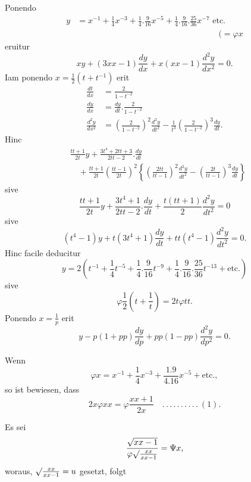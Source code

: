 \begingroup
\setlength{\headheight}{25pt}
\NoSourceHead
{}
\par\indent Ponendo
\[\begin{aligned}
y&=x^{-1}+\frac14x^{-3}+\frac14.\frac9{16}x^{-5}+\frac14.\frac9{16}.\frac{25}{36}x^{-7}\text{ etc.}\\
&\hspace{17em}(=\varphi x
\end{aligned}\]
\noindent eruitur
\[xy+(3xx-1)\frac{dy}{dx}+x(xx-1)\frac{d^2y}{dx^2}=0.\]
\noindent Iam ponendo \(x=\frac12(t+t^{-1})\) erit
\[\begin{aligned}
\frac{dt}{dx}&=\frac2{1-t^{-2}}\\
\frac{dy}{dx}&=\frac{dy}{dt}.\frac2{1-t^{-2}}\\
\frac{d^2y}{dx^2}&=\left(\frac2{1-t^{-2}}\right)^2\frac{d^2y}{dt^2}
-\frac1{t^3}\left(\frac2{1-t^{-2}}\right)^3\frac{dy}{dt}.
\end{aligned}\]
\noindent Hinc
{\small
\[\begin{aligned}
&\frac{tt+1}{2t}y+\frac{3t^4+2tt+3}{2tt-2}.\frac{dy}{dt}\\
&\quad+\frac{tt+1}{2t}\left(\frac{tt-1}{2t}\right)^2
\left\{\left(\frac{2tt}{tt-1}\right)^2\frac{d^2y}{dt^2}
-\left(\frac{2t}{tt-1}\right)^3\frac{dy}{dt}\right\}
\end{aligned}\]}
\noindent sive
\[\frac{tt+1}{2t}y+\frac{3t^4+1}{2tt-2}.\frac{dy}{dt}+\frac{t(tt+1)}2\frac{d^2y}{dt^2}=0\]
\noindent sive
\[(t^4-1)y+t(3t^4+1)\frac{dy}{dt}+tt(t^4-1)\frac{d^2y}{dt^2}=0.\]
\noindent Hinc facile deducitur
\clearpage
{}
\[y=2\left(t^{-1}+\frac14t^{-5}+\frac14.\frac9{16}t^{-9}+\frac14.\frac9{16}.\frac{25}{36}t^{-13}+\text{etc.}\right)\]
\noindent sive
\[\varphi\frac12\left(t+\frac1t\right)=2t\varphi tt.\]
\noindent Ponendo \(x=\frac1p\) erit
\[y-p(1+pp)\frac{dy}{dp}+pp(1-pp)\frac{d^2y}{dp^2}=0.\]
\ClosingRule
{}
\par\indent Wenn
\[\varphi x=x^{-1}+\frac14x^{-3}+\frac{1.9}{4.16}x^{-5}+\text{etc.},\]
\noindent so ist bewiesen, dass
\[2x\varphi xx=\varphi\frac{xx+1}{2x}\quad .\,.\,.\,.\,.\,.\,.\,.\,.\,.\ (1).\]
\par\indent Es sei
\[\frac{\sqrt{xx-1}}{\varphi\surd\frac{xx}{xx-1}}=\Psi x,\]
\noindent woraus, \(\surd\frac{xx}{xx-1}=u\) gesetzt, folgt
